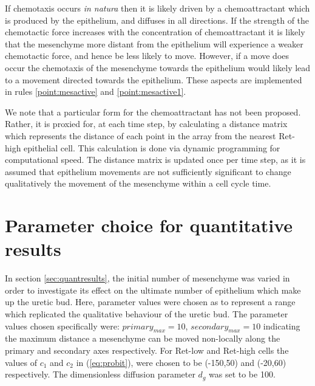 \documentclass[pdftex,10pt,a4paper,twocolumn]{article}
\begin{document}
If chemotaxis occurs \textit{in natura} then it is likely driven by a chemoattractant which is produced by the epithelium, and diffuses in all directions. If the strength of the chemotactic force increases with the concentration of chemoattractant it is likely that the mesenchyme more distant from the epithelium will experience a weaker chemotactic force, and hence be less likely to move. However, if a move does occur the chemotaxis of the mesenchyme towards the epithelium would likely lead to a movement directed towards the epithelium. These aspects are implemented in rules \ref{point:mesactive} and \ref{point:mesactive1}.

We note that a particular form for the chemoattractant has not been proposed. Rather, it is proxied for, at each time step, by calculating a distance matrix which represents the distance of each point in the array from the nearest Ret-high epithelial cell. This calculation is done via dynamic programming for computational speed. The distance matrix is updated once per time step, as it is assumed that epithelium movements are not sufficiently significant to change qualitatively the movement of the mesenchyme within a cell cycle time.

\section{Parameter choice for quantitative results}\label{sec:parameters}
In section \ref{sec:quantresults}, the initial number of mesenchyme was varied in order to investigate its effect on the ultimate number of epithelium which make up the uretic bud. Here, parameter values were chosen as to represent a range which replicated the qualitative behaviour of the uretic bud. The parameter values chosen specifically were: $primary_{max} = 10$, $secondary_{max} = 10$ indicating the maximum distance a mesenchyme can be moved non-locally along the primary and secondary axes respectively. For Ret-low and Ret-high cells the values of $c_1$ and $c_2$ in (\ref{eq:probit}), were chosen to be (-150,50) and (-20,60) respectively. The dimensionless diffusion parameter $d_g$ was set to be 100.



\end{document}
